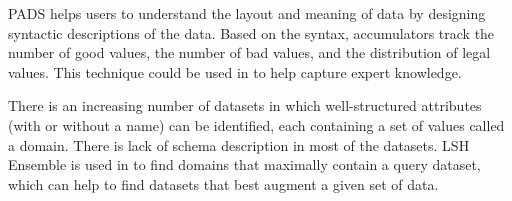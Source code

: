 PADS \cite{fisher2005pads} helps users to understand the layout and meaning of data by designing syntactic descriptions of the data.
Based on the syntax, accumulators track the number of good values, the number of bad values, and the distribution of legal values.
This technique could be used in \systemname to help capture expert knowledge.

There is an increasing number of datasets in which well-structured attributes
(with or without a name) can be identified, each containing a set of values called a domain. There is lack of schema description in most of the datasets.
LSH Ensemble is used in \cite{zhu2016lsh} to find domains that maximally contain a query dataset, which can help to find datasets that best augment a given set of data.